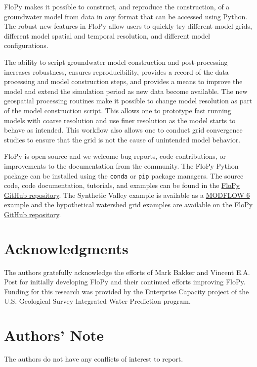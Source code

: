 \documentclass[12pt, oneside]{article}  	%
\begin{document}
FloPy makes it possible to construct, and reproduce the construction, of a groundwater model from data in any format that can be accessed using Python. The robust new features in FloPy allow users to quickly try different model grids, different model spatial and temporal resolution, and different model configurations. 

The ability to script groundwater model construction and post-processing increases robustness, ensures reproducibility, provides a record of the data processing and model construction steps, and provides a means to improve the model and extend the simulation period as new data become available. The new geospatial processing routines make it possible to change model resolution as part of the model construction script. This allows one to prototype fast running models with coarse resolution and use finer resolution as the model starts to behave as intended. This workflow also allows one to conduct grid convergence studies to ensure that the grid is not the cause of unintended model behavior.

FloPy is open source and we welcome bug reports, code contributions, or improvements to the documentation from the community. The FloPy Python package can be installed using the \texttt{conda} or \texttt{pip} package managers. The source code, code documentation, tutorials, and examples can be found in the \href{https://github.com/modflowpy/flopy}{FloPy GitHub repository}. The Synthetic Valley example is available as a \href{https://modflow6-examples.readthedocs.io/en/master/examples.html}{MODFLOW 6 example} and the hypothetical watershed grid examples are available on the \href{https://github.com/modflowpy/flopy/tree/develop/examples/mf6_groundwater_paper}{FloPy GitHub repository}.

\section*{Acknowledgments}
The authors gratefully acknowledge the efforts of Mark Bakker and Vincent E.A. Post for initially developing FloPy and their continued efforts improving FloPy. Funding for this research was provided by the Enterprise Capacity project of the U.S. Geological Survey Integrated Water Prediction program.

\section*{Authors' Note}
The authors do not have any conflicts of interest to report.
\end{document}
